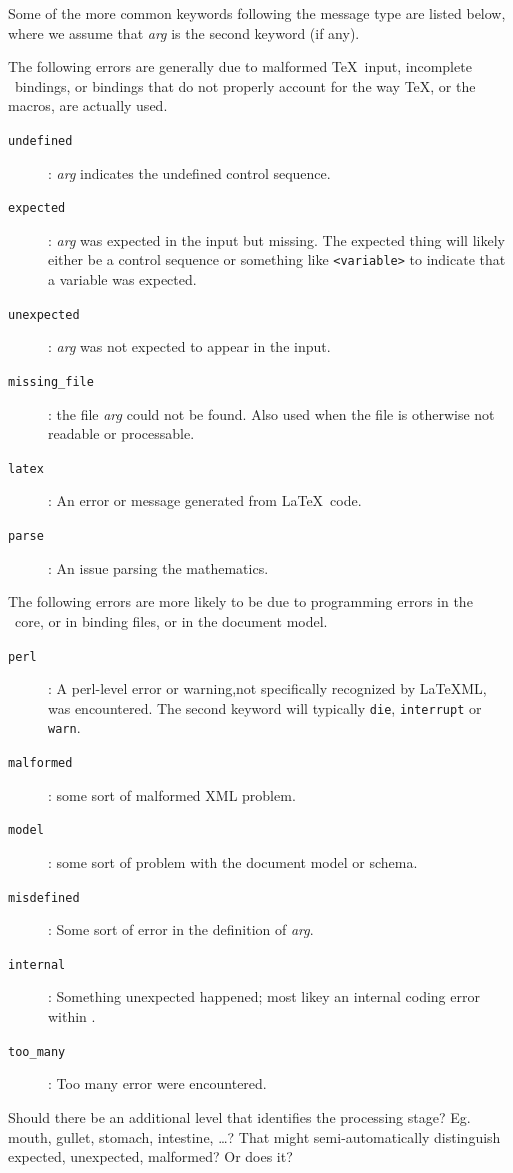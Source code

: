 \documentclass{book}
\begin{document}
Some of the more common keywords following the message type are listed below,
where we assume that \textit{arg} is the second keyword (if any).

The following errors are generally due to malformed \TeX\ input, 
incomplete \LaTeXML\ bindings, or bindings that
do not properly account for the way \TeX, or the macros, are actually used.
\begin{description}
\item[\texttt{undefined}]: \textit{arg} indicates the undefined control sequence.
\item[\texttt{expected}]: \textit{arg} was expected in the input but missing.
 The expected thing will likely either be a control sequence or something like
 \verb|<variable>| to indicate that a variable was expected.
\item[\texttt{unexpected}]: \textit{arg} was not expected to appear in the input.
\item[\texttt{missing\_file}]: the file \textit{arg} could not be found.
  Also used when the file is otherwise not readable or processable.
\item[\texttt{latex}]: An error or message generated from \LaTeX\ code.
\item[\texttt{parse}]: An issue parsing the mathematics.
\end{description}

The following errors are more likely to be due to programming errors in the
\LaTeXML\ core, or in binding files, or in the document model.
\begin{description}
\item[\texttt{perl}]: A perl-level error or warning,not specifically recognized
 by LaTeXML, was encountered.
The second keyword will typically \texttt{die}, \texttt{interrupt} or \texttt{warn}.
\item[\texttt{malformed}]: some sort of malformed XML problem.
\item[\texttt{model}]: some sort of problem with the document model or schema.
\item[\texttt{misdefined}]: Some sort of error in the definition of \textit{arg}.
\item[\texttt{internal}]: Something unexpected happened; most likey an
internal coding error within \LaTeXML.
\item[\texttt{too\_many}]: Too many error were encountered.
\end{description}


Should there be an additional level that identifies the processing stage?
Eg.~ mouth, gullet, stomach, intestine, \ldots ?
That might semi-automatically distinguish expected, unexpected, malformed?
Or does it?


\backmatter
\printindex
\end{document}
